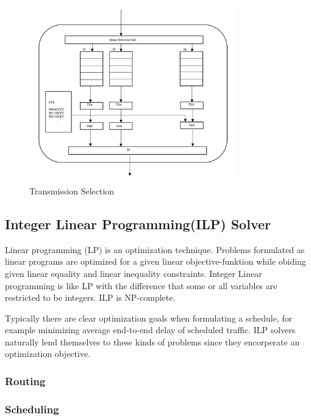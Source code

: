 \documentclass[conference]{IEEEtran}
\begin{document}
\begin{figure}
\includegraphics[width=9cm]{pic/figure_01.png}
\caption{Transmission Selection}
\end{figure}


\subsection{Integer Linear Programming(ILP) Solver}

Linear programming (LP) is an optimization technique. Problems formulated as linear programs are optimized for a given linear objective-funktion while obiding given linear equality and linear inequality constraints. Integer Linear programming is like LP with the difference that some or all variables are restricted to be integers. ILP is NP-complete.

Typically there are clear optimization goals when formulating a schedule, for example minimizing average end-to-end delay of scheduled traffic. ILP solvers naturally lend themselves to these kinds of problems since they encorperate an optimization objective.
\subsubsection{Routing}

\subsubsection{Scheduling}
\end{document}
